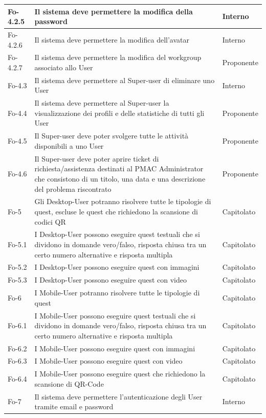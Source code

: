 \documentclass[10pt,a4paper]{article}
\begin{document}
\begin{longtable}{|p{}|p{}|p{}|}
\hline
Fo-4.2.5 & Il sistema deve permettere la modifica della password & Interno\\
\hline
Fo-4.2.6 & Il sistema deve permettere la modifica dell'avatar & Interno\\
\hline
Fo-4.2.7 & Il sistema deve permettere la modifica del workgroup associato allo User & Proponente\\
\hline
Fo-4.3 & Il sistema deve permettere al Super-user di eliminare uno User & Interno\\
\hline
Fo-4.4 & Il sistema deve permettere al Super-user la visualizzazione dei profili e delle statistiche di tutti gli User & Proponente\\
\hline
Fo-4.5 & Il Super-user deve poter svolgere tutte le attività disponibili a uno User & Proponente\\
\hline
Fo-4.6 & Il Super-user deve poter aprire ticket di richiesta/assistenza destinati al PMAC Administrator che consistono di un titolo, una data e una descrizione del problema riscontrato & Proponente\\
\hline
Fo-5 & Gli Desktop-User potranno risolvere tutte le tipologie di quest, escluse le quest che richiedono la scansione di codici QR & Capitolato\\
\hline
Fo-5.1 & I Desktop-User possono eseguire quest testuali che si dividono in domande vero/falso, risposta chiusa tra un certo numero alternative e risposta multipla & Capitolato\\
\hline
Fo-5.2 & I Desktop-User possono eseguire quest con immagini & Capitolato\\
\hline
Fo-5.3 & I Desktop-User possono eseguire quest con video & Capitolato\\
\hline
Fo-6 & I Mobile-User potranno risolvere tutte le tipologie di quest & Capitolato\\
\hline
Fo-6.1 & I Mobile-User possono eseguire quest testuali che si dividono in domande vero/falso, risposta chiusa tra un certo numero alternative e risposta multipla & Capitolato\\
\hline
Fo-6.2 & I Mobile-User possono eseguire quest con immagini & Capitolato\\
\hline
Fo-6.3 & I Mobile-User possono eseguire quest con video & Capitolato\\
\hline
Fo-6.4 & I Mobile-User possono eseguire quest che richiedono la  scansione di QR-Code & Capitolato\\
\hline
Fo-7 & Il sistema deve permettere l'autenticazione degli User tramite email e password & Interno\\

\end{longtable}
\end{document}
